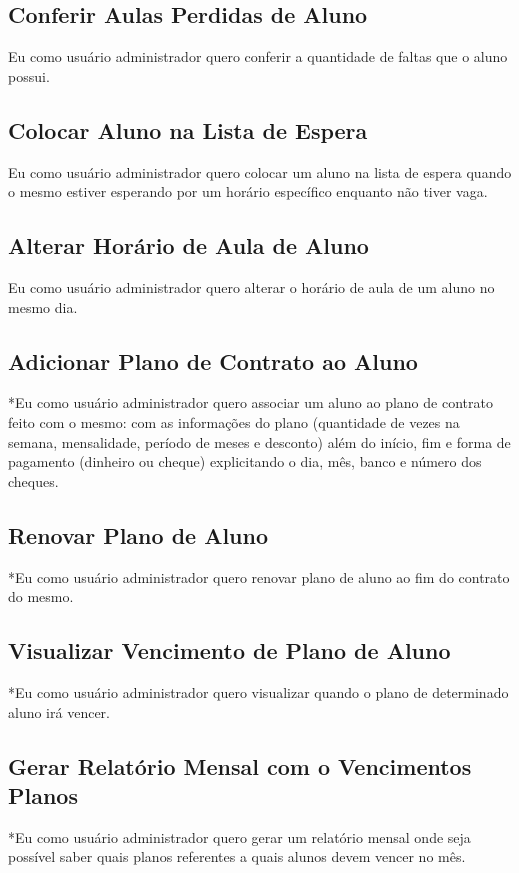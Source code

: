 \subsection[Conferir Aulas Perdidas de Aluno]{Conferir Aulas Perdidas de Aluno}
Eu como usuário administrador quero conferir a quantidade de faltas que o aluno
possui.

\subsection[Colocar Aluno na Lista de Espera]{Colocar Aluno na Lista de Espera}
Eu como usuário administrador quero colocar um aluno na lista de espera quando o
mesmo estiver esperando por um horário específico enquanto não tiver vaga.

\subsection[Alterar Horário de Aula de Aluno]{Alterar Horário de Aula de Aluno}
Eu como usuário administrador quero alterar o horário de aula de um aluno no
mesmo dia.

\subsection[Adicionar Plano de Contrato ao Aluno]{Adicionar Plano de Contrato ao Aluno}
*Eu como usuário administrador quero associar um aluno ao plano de contrato feito
com o mesmo: com as informações do plano (quantidade de vezes na semana,
mensalidade, período de meses e desconto) além do início, fim e forma de
pagamento (dinheiro ou cheque) explicitando o dia, mês, banco e número dos
cheques.

\subsection[Renovar Plano de Aluno]{Renovar Plano de Aluno}
*Eu como usuário administrador quero renovar plano de aluno ao fim do
contrato do mesmo.

\subsection[Visualizar Vencimento de Plano de Aluno]{Visualizar Vencimento de Plano de Aluno}
*Eu como usuário administrador quero visualizar quando o plano de determinado
aluno irá vencer.

\subsection[Gerar Relatório Mensal com o Vencimentos Planos]{Gerar Relatório Mensal com o Vencimentos Planos}
*Eu como usuário administrador quero gerar um relatório mensal onde seja possível
saber quais planos referentes a quais alunos devem vencer no mês.

